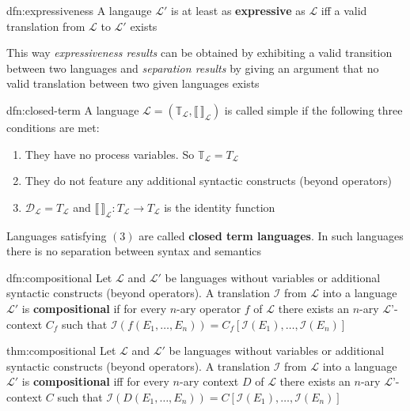\documentclass{article}
\begin{document}
\begin{dfn}[Expressiveness]{dfn:expressiveness}{}
    A langauge $\mathcal{L}'$ is at least as \textbf{expressive} as $\mathcal{L}$ iff a valid translation from $\mathcal{L}$ to $\mathcal{L}'$ exists
\end{dfn}

This way \textit{expressiveness results} can be obtained by exhibiting a valid transition between two languages and \textit{separation results} by giving an argument that no valid translation between two given languages exists

\newpage
\begin{dfn}{dfn:closed-term}{}
    A language $\mathcal{L} = (\mathbb{T}_{\mathcal{L}}, \llbracket\,\rrbracket_{\mathcal{L}})$ is called simple if the following three conditions are met:
    \begin{enumerate}
        \item They have no process variables. So $\mathbb{T}_{\mathcal{L}} = T_{\mathcal{L}}$
        \item They do not feature any additional syntactic constructs (beyond operators)
        \item $\mathcal{D}_{\mathcal{L}} = T_{\mathcal{L}}$ and $\llbracket\,\rrbracket_{\mathcal{L}} : T_{\mathcal{L}} \to T_{\mathcal{L}}$ is the identity function
    \end{enumerate}

    Languages satisfying $(3)$ are called \textbf{closed term languages}. In such languages there is no separation between syntax and semantics
\end{dfn}

\begin{dfn}[Compositional]{dfn:compositional}{}
    Let $\mathcal{L}$ and $\mathcal{L}'$ be languages without variables or additional syntactic constructs (beyond operators). A translation $\mathcal{I}$ from $\mathcal{L}$ into a language $\mathcal{L}'$ is \textbf{compositional} if for every $n$-ary operator $f$ of $\mathcal{L}$ there exists an $n$-ary $\mathcal{L}$'-context $C_{f}$ such that $\mathcal{I}(f(E_{1},\dots,E_{n})) = C_{f}[\mathcal{I}(E_{1}),\dots,\mathcal{I}(E_{n})]$
\end{dfn}

\begin{thm}[Compositional]{thm:compositional}{}
    Let $\mathcal{L}$ and $\mathcal{L}'$ be languages without variables or additional syntactic constructs (beyond operators). A translation $\mathcal{I}$ from $\mathcal{L}$ into a language $\mathcal{L}'$ is \textbf{compositional} iff for every $n$-ary context $D$ of $\mathcal{L}$ there exists an $n$-ary $\mathcal{L}$'-context $C$ such that $\mathcal{I}(D(E_{1},\dots,E_{n})) = C[\mathcal{I}(E_{1}),\dots,\mathcal{I}(E_{n})]$
\end{thm}
\end{document}
